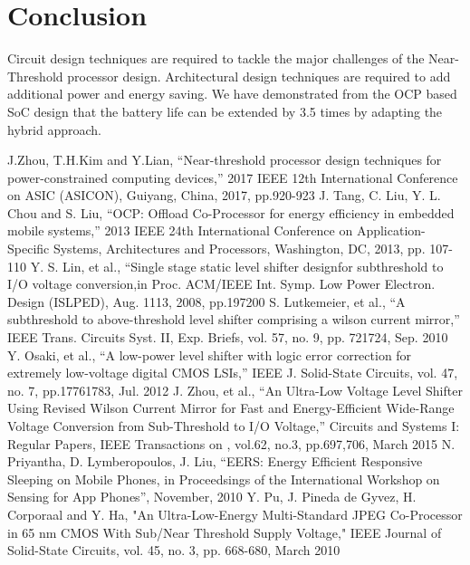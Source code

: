 \documentclass[conference]{IEEEtran}
\begin{document}
\section{Conclusion}
Circuit design techniques are required to tackle the major challenges of the
Near-Threshold processor design. Architectural design techniques are required
to add additional power and energy saving. We have demonstrated from the OCP
based SoC design that the battery life can be extended by 3.5 times by adapting
the hybrid approach.

\begin{thebibliography}{00}
 J.Zhou, T.H.Kim and Y.Lian, ``Near-threshold processor design techniques for power-constrained 
computing devices,'' 2017 IEEE 12th International Conference on ASIC (ASICON), Guiyang, China, 2017, pp.920-923
 J. Tang, C. Liu, Y. L. Chou and S. Liu, ``OCP: Offload Co-Processor
for energy efficiency in embedded mobile systems,'' 2013 IEEE 24th International Conference on Application-Specific 
Systems, Architectures and Processors, Washington, DC, 2013, pp. 107-110
 Y. S. Lin, et al., ``Single stage static level shifter designfor subthreshold to I/O voltage conversion,in Proc. ACM/IEEE Int. Symp. Low Power Electron. Design (ISLPED), Aug. 1113, 2008, pp.197200
 S. Lutkemeier, et al., ``A subthreshold to above-threshold level shifter comprising a wilson current mirror,'' IEEE Trans. Circuits Syst. II, Exp. Briefs, vol. 57, no. 9, pp. 721724, Sep. 2010
 Y. Osaki, et al., ``A low-power level shifter with logic error correction for extremely low-voltage digital CMOS LSIs,'' IEEE J. Solid-State Circuits, vol. 47, no. 7, pp.17761783, Jul. 2012
 J. Zhou, et al., ``An Ultra-Low Voltage Level Shifter Using Revised Wilson Current Mirror for Fast and Energy-Efficient Wide-Range Voltage Conversion from Sub-Threshold to I/O Voltage,'' Circuits and Systems I: Regular Papers, IEEE Transactions on , vol.62, no.3, pp.697,706, March 2015
 N. Priyantha, D. Lymberopoulos, J. Liu, ``EERS: Energy Efficient Responsive Sleeping on Mobile Phones, in Proceedsings of the International Workshop on Sensing for App Phones'', November, 2010
 Y. Pu, J. Pineda de Gyvez, H. Corporaal and Y. Ha, "An Ultra-Low-Energy Multi-Standard JPEG Co-Processor in 65 nm CMOS With Sub/Near Threshold Supply Voltage," IEEE Journal of Solid-State Circuits, vol. 45, no. 3, pp. 668-680, March 2010
\end{thebibliography}
\end{document}
